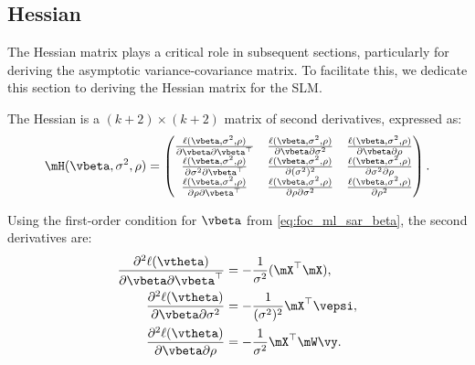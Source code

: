 \documentclass[english,12pt]{book}\usepackage[]{graphicx}\usepackage[]{xcolor}
\begin{document}
\subsection{Hessian}\label{sec:Hessian}

The Hessian matrix plays a critical role in subsequent sections, particularly for deriving the asymptotic variance-covariance matrix. To facilitate this, we dedicate this section to deriving the Hessian matrix for the SLM. 

The Hessian is a $(k + 2)\times (k + 2)$ matrix of second derivatives, expressed as:
\begin{equation*}
	\mH(\vbeta, \sigma^2, \rho) = 
	\begin{pmatrix}
		\frac{\ell(\vbeta, \sigma^2,\rho)}{\partial \vbeta \partial \vbeta^\top} & \frac{\ell(\vbeta, \sigma^2,\rho)}{\partial \vbeta \partial \sigma^2} & \frac{\ell(\vbeta, \sigma^2,\rho)}{\partial \vbeta \partial \rho} \\
		\frac{\ell(\vbeta, \sigma^2,\rho)}{\partial \sigma^2 \partial \vbeta^\top} & \frac{\ell(\vbeta, \sigma^2,\rho)}{\partial (\sigma^2)^2} & \frac{\ell(\vbeta, \sigma^2,\rho)}{\partial \sigma^2 \partial \rho} \\
		\frac{\ell(\vbeta, \sigma^2,\rho)}{\partial \rho \partial \vbeta^\top} & \frac{\ell(\vbeta, \sigma^2,\rho)}{\partial \rho \partial \sigma^2} & \frac{\ell(\vbeta, \sigma^2,\rho)}{\partial \rho^2}
	\end{pmatrix}. 
\end{equation*}

Using the first-order condition for $\vbeta$ from \eqref{eq:foc_ml_sar_beta}, the second derivatives are:
\begin{align}
  \frac{\partial^2 \ell(\vtheta)}{\partial \vbeta \partial \vbeta^\top}  & =  - \frac{1}{\sigma^2}(\mX^\top \mX), \label{eq:sar_der_beta_beta} \\
  \frac{\partial^2  \ell(\vtheta)}{\partial \vbeta \partial \sigma^2} &= - \frac{1}{(\sigma^2)^2} \mX^\top \vepsi,\label{eq:sar_der_beta_sigma} \\
  \frac{\partial^2  \ell(\vtheta)}{\partial \vbeta \partial \rho}  & =  - \frac{1}{\sigma^2} \mX^\top \mW\vy\label{eq:sar_der_beta_rho}.
\end{align}
\end{document}
